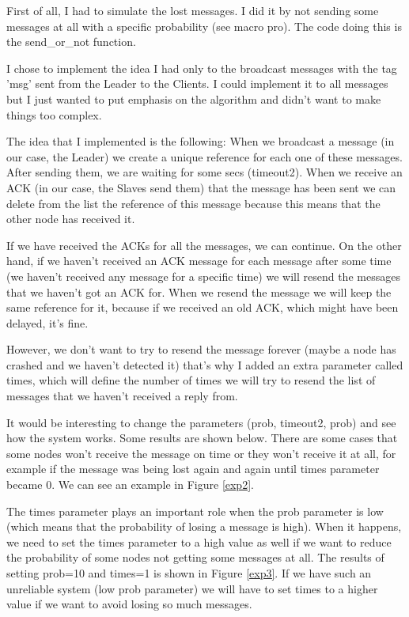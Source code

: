 \documentclass[a4paper, 11pt]{article}
\begin{document}
First of all, I had to simulate the lost messages. I did it by not sending some messages at all with a specific probability (see macro pro). The code doing this is the send\_or\_not function. 

I chose to implement the idea I had only to the broadcast messages with the tag 'msg' sent from the Leader to the Clients. I could implement it to all messages but I just wanted to put emphasis on the algorithm and didn't want to make things too complex.

The idea that I implemented is the following: When we broadcast a message (in our case, the Leader) we create a unique reference for each one of these messages. After sending them, we are waiting for some secs (timeout2). When we receive an ACK (in our case, the Slaves send them) that the message has been sent we can delete from the list the reference of this message because this means that the other node has received it. 

If we have received the ACKs for all the messages, we can continue. On the other hand, if we haven't received an ACK message for each message after some time (we haven't received any message for a specific time) we will resend the messages that we haven't got an ACK for. When we resend the message we will keep the same reference for it, because if we received an old ACK, which might have been delayed, it's fine.

However, we don't want to try to resend the message forever (maybe a node has crashed and we haven't detected it) that's why I added an extra parameter called times, which will define the number of times we will try to resend the list of messages that we haven't received a reply from.

It would be interesting to change the parameters (prob, timeout2, prob) and see how the system works. Some results are shown below. There are some cases that some nodes won't receive the message on time or they won't receive it at all, for example if the message was being lost again and again until times parameter became 0. We can see an example in Figure \ref{exp2}.

The times parameter plays an important role when the prob parameter is low (which means that the probability of losing a message is high). When it happens, we need to set the times parameter to a high value as well if we want to reduce the probability of some nodes not getting some messages at all. The results of setting prob=10 and times=1 is shown in Figure \ref{exp3}. If we have such an unreliable system (low prob parameter) we will have to set times to a higher value if we want to avoid losing so much messages.
\end{document}
